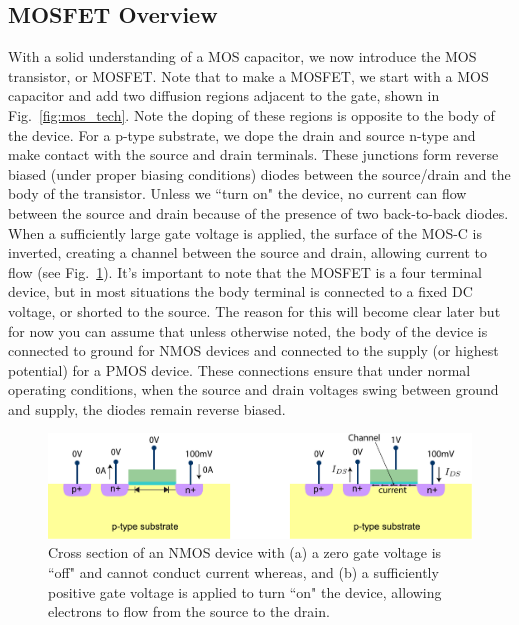 \subsection{MOSFET Overview}
With a solid understanding of a MOS capacitor, we now introduce the MOS transistor, or MOSFET.  Note that to make a MOSFET, we start with a MOS capacitor and add two diffusion regions adjacent to the gate, shown in Fig.~\ref{fig:mos_tech}.  Note the doping of these regions is opposite to the body of the device.  For a p-type substrate, we dope the drain and source n-type and make contact with the source and drain terminals.  These junctions form reverse biased (under proper biasing conditions) diodes between the source/drain and the body of the transistor.  Unless we ``turn on" the device, no current can flow between the source and drain because of the presence of two back-to-back diodes.  When a sufficiently large gate voltage is applied, the surface of the MOS-C is inverted, creating a channel between the source and drain, allowing current to flow (see Fig.~\ref{fig:mos_current}).    
It's important to note that the MOSFET is a four terminal device, but in most situations the body terminal is connected to a fixed DC voltage, or shorted to the source.  The reason for this will become clear later but for now you can assume that unless otherwise noted, the body of the device is connected to ground for NMOS devices and connected to the supply (or highest potential) for a PMOS device.  These connections ensure that under normal operating conditions, when the source and drain voltages swing between ground and supply, the diodes remain reverse biased.
\begin{figure}[tb]
\centering
\includegraphics[width=\columnwidth]{mostfetxsect_current} 
\caption{Cross section of an NMOS device with (a) a zero gate voltage is ``off" and cannot conduct current whereas, and (b) a sufficiently positive gate voltage is applied to turn ``on" the device, allowing electrons to flow from the source to the drain.}
\label{fig:mos_current}
\end{figure}
